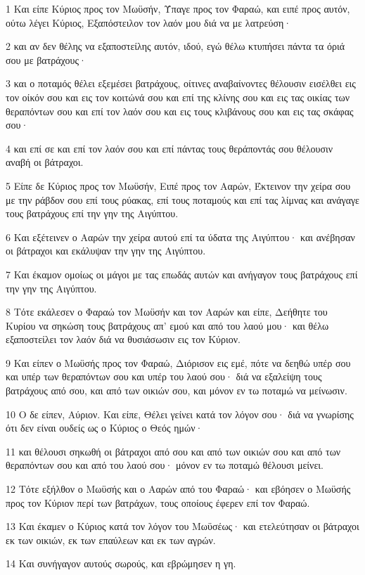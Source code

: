 \par 1 Και είπε Κύριος προς τον Μωϋσήν, Ύπαγε προς τον Φαραώ, και ειπέ προς αυτόν, ούτω λέγει Κύριος, Εξαπόστειλον τον λαόν μου διά να με λατρεύση·
\par 2 και αν δεν θέλης να εξαποστείλης αυτόν, ιδού, εγώ θέλω κτυπήσει πάντα τα όριά σου με βατράχους·
\par 3 και ο ποταμός θέλει εξεμέσει βατράχους, οίτινες αναβαίνοντες θέλουσιν εισέλθει εις τον οίκόν σου και εις τον κοιτώνά σου και επί της κλίνης σου και εις τας οικίας των θεραπόντων σου και επί τον λαόν σου και εις τους κλιβάνους σου και εις τας σκάφας σου·
\par 4 και επί σε και επί τον λαόν σου και επί πάντας τους θεράποντάς σου θέλουσιν αναβή οι βάτραχοι.
\par 5 Είπε δε Κύριος προς τον Μωϋσήν, Ειπέ προς τον Ααρών, Έκτεινον την χείρα σου με την ράβδον σου επί τους ρύακας, επί τους ποταμούς και επί τας λίμνας και ανάγαγε τους βατράχους επί την γην της Αιγύπτου.
\par 6 Και εξέτεινεν ο Ααρών την χείρα αυτού επί τα ύδατα της Αιγύπτου· και ανέβησαν οι βάτραχοι και εκάλυψαν την γην της Αιγύπτου.
\par 7 Και έκαμον ομοίως οι μάγοι με τας επωδάς αυτών και ανήγαγον τους βατράχους επί την γην της Αιγύπτου.
\par 8 Τότε εκάλεσεν ο Φαραώ τον Μωϋσήν και τον Ααρών και είπε, Δεήθητε του Κυρίου να σηκώση τους βατράχους απ' εμού και από του λαού μου· και θέλω εξαποστείλει τον λαόν διά να θυσιάσωσιν εις τον Κύριον.
\par 9 Και είπεν ο Μωϋσής προς τον Φαραώ, Διόρισον εις εμέ, πότε να δεηθώ υπέρ σου και υπέρ των θεραπόντων σου και υπέρ του λαού σου· διά να εξαλείψη τους βατράχους από σου, και από των οικιών σου, και μόνον εν τω ποταμώ να μείνωσιν.
\par 10 Ο δε είπεν, Αύριον. Και είπε, Θέλει γείνει κατά τον λόγον σου· διά να γνωρίσης ότι δεν είναι ουδείς ως ο Κύριος ο Θεός ημών·
\par 11 και θέλουσι σηκωθή οι βάτραχοι από σου και από των οικιών σου και από των θεραπόντων σου και από του λαού σου· μόνον εν τω ποταμώ θέλουσι μείνει.
\par 12 Τότε εξήλθον ο Μωϋσής και ο Ααρών από του Φαραώ· και εβόησεν ο Μωϋσής προς τον Κύριον περί των βατράχων, τους οποίους έφερεν επί τον Φαραώ.
\par 13 Και έκαμεν ο Κύριος κατά τον λόγον του Μωϋσέως· και ετελεύτησαν οι βάτραχοι εκ των οικιών, εκ των επαύλεων και εκ των αγρών.
\par 14 Και συνήγαγον αυτούς σωρούς, και εβρώμησεν η γη.
